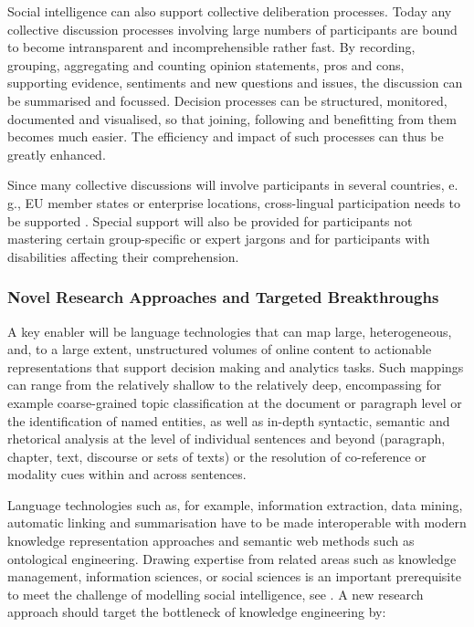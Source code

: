\documentclass[10pt, plain]{../../metanetpaper}
\begin{document}
\begin{multicols}{2}
Social intelligence can also support collective deliberation processes. Today any collective discussion processes involving large numbers of participants are bound to become intransparent and incomprehensible rather fast. By recording, grouping, aggregating and counting opinion statements, pros and cons, supporting evidence, sentiments and new questions and issues, the discussion can be summarised and focussed. Decision processes can be structured, monitored, documented and visualised, so that joining, following and benefitting from them becomes much easier. The efficiency and impact of such processes can thus be greatly enhanced.
 
Since many collective discussions will involve participants in several countries, e.\,g., EU member states or enterprise locations, cross-lingual participation needs to be supported \cite{ombudsman2012}. Special support will also be provided for participants not mastering certain group-specific or expert jargons and for participants with disabilities affecting their comprehension.

\subsubsection{Novel Research Approaches and Targeted Breakthroughs}
\label{sec:novel-rese-appr-pt2}

A key enabler will be language technologies that can map large, heterogeneous, and, to a large extent, unstructured volumes of online content to actionable representations that support decision making and analytics tasks. Such mappings can range from the relatively shallow to the relatively deep, encompassing for example coarse-grained topic classification at the document or paragraph level or the identification of named entities, as well as in-depth syntactic, semantic and rhetorical analysis at the level of individual sentences and beyond (paragraph, chapter, text, discourse or sets of texts) or the resolution of co-reference or modality cues within and across sentences.

Language technologies such as, for example, information extraction, data mining, automatic linking and summarisation have to be made interoperable with modern knowledge representation approaches and semantic web methods such as ontological engineering. Drawing expertise from related areas such as knowledge management, information sciences, or social sciences is an important prerequisite to meet the challenge of modelling social intelligence, see \cite{ltds2012}. A new research approach should target the bottleneck of knowledge engineering by:


\end{multicols}
\end{document}
